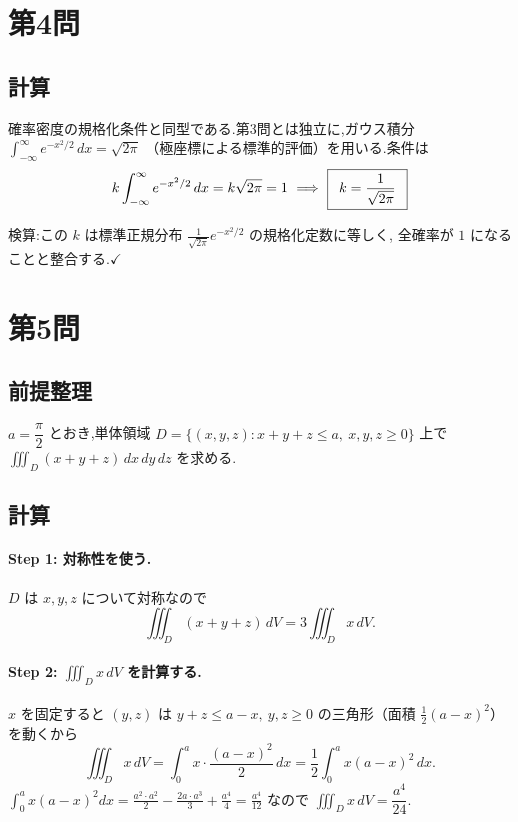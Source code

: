 \documentclass[11pt,a4paper]{article}
\begin{document}
\section*{第4問}

\subsection*{計算}

確率密度の規格化条件と同型である.第3問とは独立に,ガウス積分
$\displaystyle\int_{-\infty}^{\infty}e^{-x^2/2}\,dx=\sqrt{2\pi}$
（極座標による標準的評価）を用いる.条件は
\[
k\int_{-\infty}^{\infty}e^{-x^2/2}\,dx=k\sqrt{2\pi}=1
\ \Longrightarrow\
\boxed{\,\ k=\dfrac{1}{\sqrt{2\pi}}\ \,}
\]

検算:この $k$ は標準正規分布 $\frac{1}{\sqrt{2\pi}}e^{-x^2/2}$ の規格化定数に等しく,
全確率が $1$ になることと整合する.$\checkmark$

\section*{第5問}

\subsection*{前提整理}

$a=\dfrac{\pi}{2}$ とおき,単体領域
$D=\{(x,y,z):x+y+z\le a,\ x,y,z\ge0\}$ 上で
$\displaystyle\iiint_D(x+y+z)\,dx\,dy\,dz$ を求める.

\subsection*{計算}

\paragraph{Step 1: 対称性を使う.}
$D$ は $x,y,z$ について対称なので
\[
\iiint_D(x+y+z)\,dV=3\iiint_D x\,dV.
\]

\paragraph{Step 2: $\iiint_D x\,dV$ を計算する.}
$x$ を固定すると $(y,z)$ は $y+z\le a-x,\ y,z\ge0$ の三角形（面積 $\tfrac12(a-x)^2$）を動くから
\[
\iiint_D x\,dV=\int_0^a x\cdot\frac{(a-x)^2}{2}\,dx
=\frac12\int_0^a x(a-x)^2\,dx.
\]
$\displaystyle\int_0^a x(a-x)^2dx=\frac{a^2\cdot a^2}{2}-\frac{2a\cdot a^3}{3}+\frac{a^4}{4}=\frac{a^4}{12}$
なので $\iiint_D x\,dV=\dfrac{a^4}{24}$.
\end{document}
